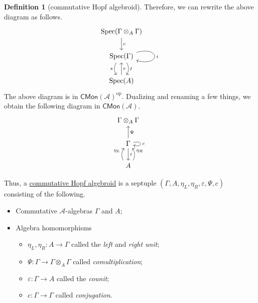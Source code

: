 \documentclass[a4paper]{report}
\newcommand{\defn}[1]{\ul{#1}}
\newcommand{\Spec}{\mathrm{Spec}}
\theoremstyle{definition}
\newtheorem{definition}{Definition}[section]
\theoremstyle{plain}
\theoremstyle{remark}
\begin{document}
\begin{definition}[commutative Hopf algebroid]
  Therefore, we can rewrite the above diagram as follows.
  \begin{equation*}
    \begin{tikzcd}
      \Spec(\Gamma \otimes_{A} \Gamma)
      \arrow[d, "c"]
      \\
      \Spec(\Gamma)
      \arrow[d, shift left, bend left, "t"]
      \arrow[d, shift right, bend right, swap, "s"]
      \arrow[loop right, "i"]
      \\
      \Spec(A)
      \arrow[u, swap, "e"]
    \end{tikzcd}
  \end{equation*}
  The above diagram is in $\mathsf{CMon}(\mathscr{A})^{\mathrm{op}}$. Dualizing and renaming a few things, we obtain the following diagram in $\mathsf{CMon}(\mathscr{A})$.
  \begin{equation*}
    \begin{tikzcd}
      \Gamma \otimes_{A} \Gamma
      \\
      \Gamma
      \arrow[u, swap, "\Psi"]
      \arrow[d, "\varepsilon"]
      \arrow[loop right, "c"]
      \\
      A
      \arrow[u, shift left, bend left, "\eta_{L}"]
      \arrow[u, shift right, bend right, swap, "\eta_{R}"]
    \end{tikzcd}
  \end{equation*}

  Thus, a \defn{commutative Hopf algebroid} is a septuple $(\Gamma, A, \eta_{L}, \eta_{R}, \varepsilon, \Psi, c)$ consisting of the following.
  \begin{itemize}
    \item Commutative $\mathscr{A}$-algebras $\Gamma$ and $A$;

    \item Algebra homomorphisms
      \begin{itemize}
        \item $\eta_{L},\eta_{R}\colon A \to \Gamma$ called the \emph{left} and \emph{right unit};

        \item $\Psi\colon \Gamma \to \Gamma \otimes_{A} \Gamma$ called \emph{comultiplication};

        \item $\varepsilon\colon \Gamma \to A$ called the \emph{counit};

        \item $c\colon \Gamma \to \Gamma$ called \emph{conjugation}.
      \end{itemize}
  \end{itemize}


\end{definition}
\end{document}
